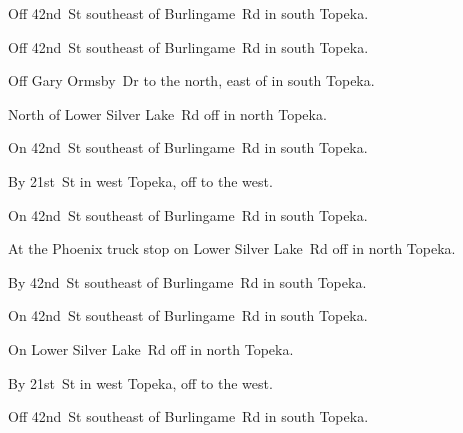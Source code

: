 

\begin{LocationList}

Off 42nd~St southeast of Burlingame~Rd in south Topeka.

Off 42nd~St southeast of Burlingame~Rd in south Topeka.

Off Gary Ormsby~Dr to the north, east of  in south Topeka.

North of Lower Silver Lake~Rd off  in north Topeka.

\Location{\GarageHQ \Garage}
On 42nd~St southeast of Burlingame~Rd in south Topeka.

By 21st~St in west Topeka, off   to the west.

On 42nd~St southeast of Burlingame~Rd in south Topeka.

At the Phoenix truck stop on Lower Silver Lake~Rd off  in north Topeka.

\Location{\RecruitmentAgency \Recruitment}
By 42nd~St southeast of Burlingame~Rd in south Topeka.

\Location{\TruckService \Service \Rest}
On 42nd~St southeast of Burlingame~Rd in south Topeka.

On Lower Silver Lake~Rd off  in north Topeka.

By 21st~St in west Topeka, off   to the west.

Off 42nd~St southeast of Burlingame~Rd in south Topeka.

\end{LocationList}
